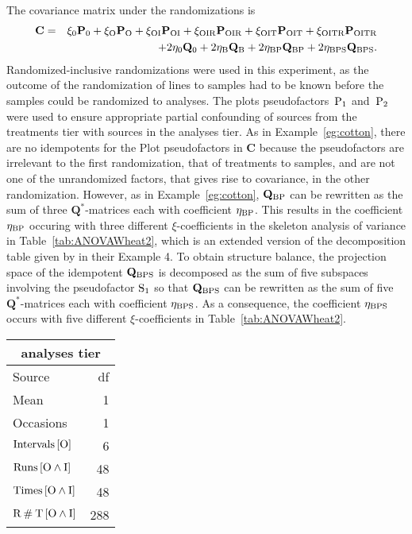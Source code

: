 The covariance matrix under the randomizations is
\begin{eqnarray}
\mathbf{C} & = & \xi_0 \mathbf{P}_0 + \xi_\mathrm{O}
\mathbf{P}_\mathrm{O} + \xi_\mathrm{OI} \mathbf{P}_\mathrm{OI} +
\xi_\mathrm{OIR} \mathbf{P}_\mathrm{OIR} + \xi_\mathrm{OIT}
\mathbf{P}_\mathrm{OIT} +
\xi_\mathrm{OITR} \mathbf{P}_\mathrm{OITR} \nonumber\\
& & \qquad + 2\eta_0 \mathbf{Q}_0 + 2\eta_\mathrm{B}
\mathbf{Q}_\mathrm{B} + 2\eta_\mathrm{BP} \mathbf{Q}_\mathrm{BP} +
2\eta_\mathrm{BPS} \mathbf{Q}_\mathrm{BPS}. \nonumber
\end{eqnarray}
Randomized-inclusive randomizations were used in this experiment, as
the outcome of the randomization of lines to samples had to be known
before the samples could be randomized to analyses.
The plots pseudofactors~$\mathrm{P}_1$ and~$\mathrm{P}_2$ were
used to ensure appropriate partial confounding of sources from the
treatments tier with sources in the analyses tier. As in
Example~\ref{eg:cotton}, there are no idempotents for the Plot
pseudofactors in $\mathbf{C}$ because the pseudo\-factors are irrelevant
to the first randomization, that of treatments to samples, and are not
one of the unrandomized factors, that gives rise to covariance, in the
other randomization. However, as in Example~\ref{eg:cotton},
$\mathbf{Q}_\mathrm{BP}$ can be rewritten as the sum of three
$\mathbf{Q}^*$-matrices each with coefficient $\eta_{\mathrm{BP}}$.
This results in the coefficient $\eta_{\mathrm{BP}}$ occuring with
three different $\xi$-coefficients in the skeleton analysis of variance
in Table~\ref{tab:ANOVAWheat2}, which is an extended version of the
decomposition table given by \cite{BrBa:decomp} in their Example 4.
To obtain structure balance, the projection space of the idempotent $\mathbf{Q}_\mathrm{BPS}$ is decomposed as the sum of
five subspaces involving the pseudofactor $\mathrm{S}_1$ so that
$\mathbf{Q}_\mathrm{BPS}$ can be rewritten as the sum of five
$\mathbf{Q}^*$-matrices each with coefficient $\eta_{\mathrm{BPS}}$. As
a consequence, the coefficient $\eta_{\mathrm{BPS}}$ occurs with five
different $\xi$-coefficients in Table~\ref{tab:ANOVAWheat2}.

\begin{center}
\begin{tabular}{lr}
\toprule
\multicolumn{2}{c}{analyses tier} \\
\midrule
Source & df    \\
\midrule
Mean & 1    \\
    Occasions & 1    \\
    $\mathrm{Intervals}\left[\mathrm{O}\right]$ & 6   \\
$\mathrm{Runs} \left[\mathrm{O}\wedge\mathrm{I}\right]$ & 48  \\
$\mathrm{Times}\left[\mathrm{O}\wedge\mathrm{I}\right]$ & 48  \\
$\mathrm{R}\mathbin{\#}\mathrm{T}\left[\mathrm{O}\wedge\mathrm{I}\right]$ & 288  \\
\bottomrule
\end{tabular}
\end{center}

